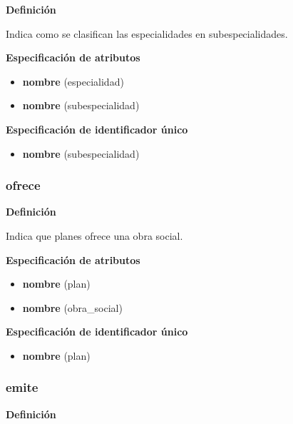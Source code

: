 \documentclass[a4paper,11pt]{article}
\begin{document}
\textbf{Definición}

Indica como se clasifican las especialidades en subespecialidades.

\textbf{Especificación de atributos}


\begin{itemize}

     \item \textbf{nombre} (especialidad)

     \item \textbf{nombre} (subespecialidad)


\end{itemize}

\textbf{Especificación de identificador único}

\begin{itemize}

     \item \textbf{nombre} (subespecialidad)


\end{itemize}


\subsubsection{\textbf{ofrece}}

\textbf{Definición}

Indica que planes ofrece una obra social.

\textbf{Especificación de atributos}


\begin{itemize}
     \item \textbf{nombre} (plan)

     \item \textbf{nombre} (obra\_social)


\end{itemize}

\textbf{Especificación de identificador único}

\begin{itemize}

    \item \textbf{nombre} (plan)


\end{itemize}


\subsubsection{\textbf{emite}}

\textbf{Definición}
\end{document}

